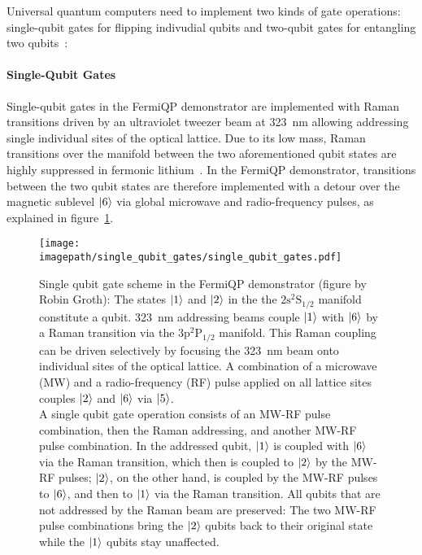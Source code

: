 Universal quantum computers need to implement two kinds of gate operations: single-qubit gates for flipping indivudial qubits and two-qubit gates for entangling two qubits~\cite{hidary_quantum_2021, mainzer_quantencomputer_2020}:

\paragraph*{Single-Qubit Gates}
Single-qubit gates in the FermiQP demonstrator are implemented with Raman transitions driven by an ultraviolet tweezer beam at \SI[]{323}{\nano\meter} allowing addressing single individual sites of the optical lattice. Due to its low mass, Raman transitions over the manifold between the two aforementioned qubit states are highly suppressed in  fermonic lithium~\cite{wei_magnetic-field_2013}. In the FermiQP demonstrator, transitions between the two qubit states are therefore implemented with a detour over the magnetic sublevel $\Ket{6}$ via global microwave and radio-frequency pulses, as explained in figure~\ref{fig:single_qubit_gates}.

\begin{figure}
    \centering
    \texttt{[image: \\imagepath/single\_qubit\_gates/single\_qubit\_gates.pdf]}
    \caption{Single qubit gate scheme in the FermiQP demonstrator (figure by Robin Groth): The states $\Ket{1}$ and $\Ket{2}$ in the the $2\text{s} ^2\text{S}_{1/2}$ manifold constitute a qubit.
    \SI[]{323}{\nano\meter} addressing beams couple $\Ket{1}$ with $\Ket{6}$ by a Raman transition via the $3\text{p} ^2\text{P}_{1/2}$ manifold. This Raman coupling can be driven selectively by focusing the \SI[]{323}{\nano\meter} beam onto individual sites of the optical lattice.
    A combination of a microwave (MW) and a radio-frequency (RF) pulse applied on all lattice sites couples $\Ket{2}$ and $\Ket{6}$ via $\Ket{5}$.\\
    A single qubit gate operation consists of an MW-RF pulse combination, then the Raman addressing, and another MW-RF pulse combination.
    In the addressed qubit, $\Ket{1}$ is coupled with $\Ket{6}$ via the Raman transition, which then is coupled to $\Ket{2}$ by the MW-RF pulses; $\Ket{2}$, on the other hand, is coupled by the MW-RF pulses to $\Ket{6}$, and then to $\Ket{1}$ via the Raman transition.
    All qubits that are not addressed by the Raman beam are preserved: The two MW-RF pulse combinations bring the $\Ket{2}$ qubits back to their original state while the $\Ket{1}$ qubits stay unaffected.}
    \label{fig:single_qubit_gates}
\end{figure}

